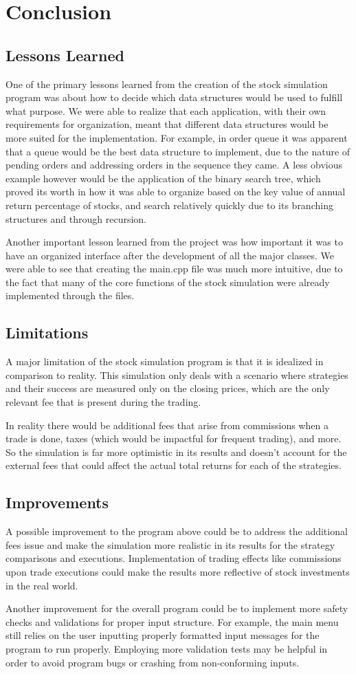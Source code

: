 \documentclass[12pt]{article}
\begin{document}
\section{Conclusion}
\subsection{Lessons Learned}
One of the primary lessons learned from the creation of the stock simulation program was 
about how to decide which data structures would be used to fulfill what purpose. 
We were able to realize that each application, with their own requirements for organization, 
meant that different data structures would be more suited for the implementation. 
For example, in order queue it was apparent that a queue would be the best data structure to 
implement, due to the nature of pending orders and addressing orders in the sequence they came. 
A less obvious example however would be the application of the binary search tree, which proved its worth in 
how it was able to organize based on the key value of annual return percentage of stocks, and search relatively 
quickly due to its branching structures and through recursion. 

Another important lesson learned from the project was how important it was to have an organized interface 
after the development of all the major classes. 
We were able to see that creating the main.cpp file was much more intuitive, due to the fact that many of 
the core functions of the stock simulation were already implemented through the files. 
\subsection{Limitations}
A major limitation of the stock simulation program is that it is idealized in comparison to reality. 
This simulation only deals with a scenario where strategies and their success are measured only on the closing 
prices, which are the only relevant fee that is present during the trading. 

In reality there would be additional fees that arise from commissions when a trade is done, taxes 
(which would be impactful for frequent trading), and more. 
So the simulation is far more optimistic in its results and doesn't account for the external fees that could 
affect the actual total returns for each of the strategies.  
\subsection{Improvements} 
A possible improvement to the program above could be to address the additional fees issue and make the 
simulation more realistic in its results for the strategy comparisons and executions. 
Implementation of trading effects like commissions upon trade executions could make the results more reflective 
of stock investments in the real world. 

Another improvement for the overall program could be to implement more safety checks and validations for proper 
input structure. For example, the main menu still relies on the user inputting properly formatted input messages 
for the program to run properly. Employing more validation tests may be helpful in order to avoid program bugs 
or crashing from non-conforming inputs. 
\end{document}

